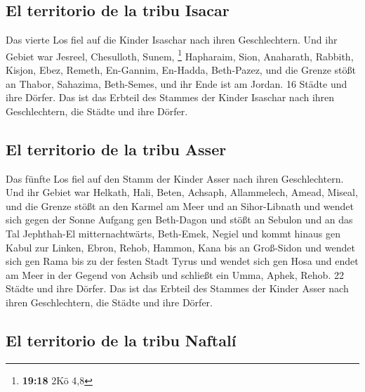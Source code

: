 \hypertarget{el-territorio-de-la-tribu-isacar}{%
\subsection{El territorio de la tribu
Isacar}\label{el-territorio-de-la-tribu-isacar}}

 Das vierte Los fiel auf die Kinder Isaschar nach ihren
Geschlechtern.  Und ihr Gebiet war Jesreel, Chesulloth,
Sunem, \footnote{\textbf{19:18} 2Kö 4,8}  Hapharaim,
Sion, Anaharath,  Rabbith, Kisjon, Ebez, 
Remeth, En-Gannim, En-Hadda, Beth-Pazez,  und die Grenze
stößt an Thabor, Sahazima, Beth-Semes, und ihr Ende ist am Jordan. 16
Städte und ihre Dörfer.  Das ist das Erbteil des Stammes
der Kinder Isaschar nach ihren Geschlechtern, die Städte und ihre
Dörfer.

\hypertarget{el-territorio-de-la-tribu-asser}{%
\subsection{El territorio de la tribu
Asser}\label{el-territorio-de-la-tribu-asser}}

 Das fünfte Los fiel auf den Stamm der Kinder Asser nach
ihren Geschlechtern.  Und ihr Gebiet war Helkath, Hali,
Beten, Achsaph,  Allammelech, Amead, Miseal, und die
Grenze stößt an den Karmel am Meer und an Sihor-Libnath 
und wendet sich gegen der Sonne Aufgang gen Beth-Dagon und stößt an
Sebulon und an das Tal Jephthah-El mitternachtwärts, Beth-Emek, Negiel
und kommt hinaus gen Kabul zur Linken,  Ebron, Rehob,
Hammon, Kana bis an Groß-Sidon  und wendet sich gen Rama
bis zu der festen Stadt Tyrus und wendet sich gen Hosa und endet am Meer
in der Gegend von Achsib  und schließt ein Umma, Aphek,
Rehob. 22 Städte und ihre Dörfer.  Das ist das Erbteil
des Stammes der Kinder Asser nach ihren Geschlechtern, die Städte und
ihre Dörfer.

\hypertarget{el-territorio-de-la-tribu-naftaluxed}{%
\subsection{El territorio de la tribu
Naftalí}\label{el-territorio-de-la-tribu-naftaluxed}}

